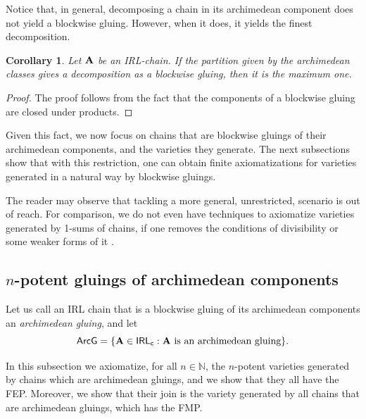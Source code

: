 \documentclass{amsart}
\newtheorem{corollary}[theorem]{Corollary}
\theoremstyle{definition}
\numberwithin{equation}{section}
\newcommand{\alg}[1]{{\textbf{\upshape #1}}}  %
\newcommand{\vv}[1]{\mathsf {#1}}
\newcommand{\BlockG}{\vv{ArcG}}
\begin{document}
Notice that, in general, decomposing a chain in its archimedean component does not yield a blockwise gluing. However, when it does, it yields the finest decomposition.
\begin{corollary}
	Let $\alg A$ be an IRL-chain. If the partition given by the archimedean classes gives a decomposition as a blockwise gluing, then it is the maximum one.
\end{corollary}
\begin{proof}
	The proof follows from the fact that the components of a blockwise gluing are closed under products.
\end{proof}
Given this fact, we now focus on chains that are blockwise gluings of their archimedean components, and the varieties they generate.
The next subsections show that with this restriction, one can obtain finite axiomatizations for varieties generated in a natural way by blockwise gluings. 

The reader may observe that tackling a more general, unrestricted, scenario is out of reach. For comparison, we do not even have techniques to axiomatize varieties generated by 1-sums of chains, if one removes the conditions of divisibility \cite{AM2003} or some weaker forms of it \cite{GalatosUgolinimanuscript}.

 \subsection{$n$-potent gluings of archimedean components}\label{subsection:axiom-npotent}
Let us call an IRL chain that is a blockwise gluing of its archimedean components an {\em archimedean gluing}, and let 
\begin{equation*}
	\BlockG = \{\alg A \in \vv{IRL_c}: \alg A \mbox{ is an archimedean gluing}\}.
\end{equation*}

In this subsection we axiomatize, for all $n \in \mathbb{N}$, the $n$-potent varieties generated by chains which are archimedean gluings, and we show that they all have the FEP. Moreover, we show that their join is the variety generated by all chains that are archimedean gluings, which has the FMP.
 
\end{document}
